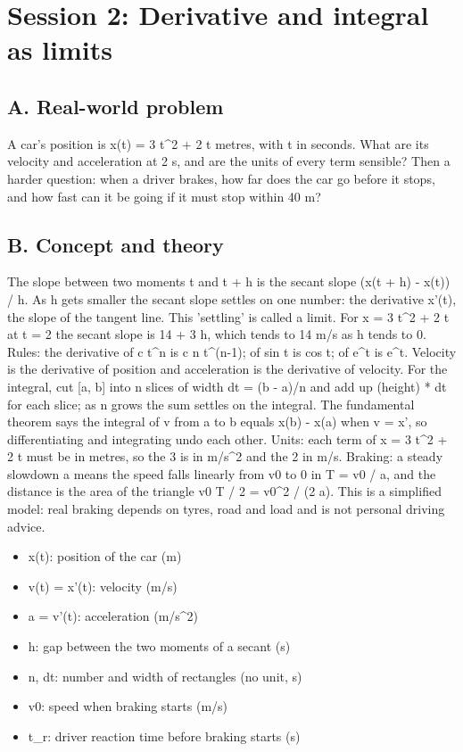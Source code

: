 \documentclass[11pt,a4paper]{article}
\begin{document}
\section{Session 2: Derivative and integral as limits}

\subsection*{A. Real-world problem}
A car's position is x(t) = 3 t\textasciicircum{}2 + 2 t metres, with t in seconds. What are its velocity and acceleration at 2 s, and are the units of every term sensible? Then a harder question: when a driver brakes, how far does the car go before it stops, and how fast can it be going if it must stop within 40 m?

\subsection*{B. Concept and theory}
The slope between two moments t and t + h is the secant slope (x(t + h) - x(t)) / h. As h gets smaller the secant slope settles on one number: the derivative x'(t), the slope of the tangent line. This 'settling' is called a limit. For x = 3 t\textasciicircum{}2 + 2 t at t = 2 the secant slope is 14 + 3 h, which tends to 14 m/s as h tends to 0. Rules: the derivative of c t\textasciicircum{}n is c n t\textasciicircum{}(n-1); of sin t is cos t; of e\textasciicircum{}t is e\textasciicircum{}t. Velocity is the derivative of position and acceleration is the derivative of velocity. For the integral, cut [a, b] into n slices of width dt = (b - a)/n and add up (height) * dt for each slice; as n grows the sum settles on the integral. The fundamental theorem says the integral of v from a to b equals x(b) - x(a) when v = x', so differentiating and integrating undo each other. Units: each term of x = 3 t\textasciicircum{}2 + 2 t must be in metres, so the 3 is in m/s\textasciicircum{}2 and the 2 in m/s. Braking: a steady slowdown a means the speed falls linearly from v0 to 0 in T = v0 / a, and the distance is the area of the triangle v0 T / 2 = v0\textasciicircum{}2 / (2 a). This is a simplified model: real braking depends on tyres, road and load and is not personal driving advice.

\begin{itemize}[nosep]
\item x(t): position of the car (m)
\item v(t) = x'(t): velocity (m/s)
\item a = v'(t): acceleration (m/s\textasciicircum{}2)
\item h: gap between the two moments of a secant (s)
\item n, dt: number and width of rectangles (no unit, s)
\item v0: speed when braking starts (m/s)
\item t\_r: driver reaction time before braking starts (s)
\end{itemize}
\end{document}
